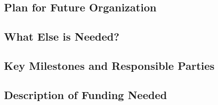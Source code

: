 \subsection{Plan for Future Organization}


\subsection{What Else is Needed?}


\subsection{Key Milestones and Responsible Parties}


\subsection{Description of Funding Needed}
